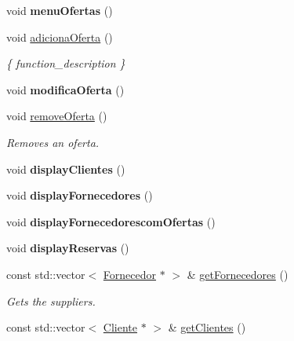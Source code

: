 \begin{DoxyCompactItemize}
\mbox{\label{classEmpresa_a3cab1a61ff84c5b20ac2faa6251e25ed}} 
void {\bfseries menu\+Ofertas} ()
\item 
\mbox{\label{classEmpresa_ae244a8ae3afb85eb5e9e5febce8b8728}} 
void \hyperlink{classEmpresa_ae244a8ae3afb85eb5e9e5febce8b8728}{adiciona\+Oferta} ()
\begin{DoxyCompactList}\small\item\em \{ function\+\_\+description \} \end{DoxyCompactList}\item 
\mbox{\label{classEmpresa_ac8948065c65d5c02cb30103118f502d4}} 
void {\bfseries modifica\+Oferta} ()
\item 
\mbox{\label{classEmpresa_a5b5c42d733ccee37f932db5db8aec243}} 
void \hyperlink{classEmpresa_a5b5c42d733ccee37f932db5db8aec243}{remove\+Oferta} ()
\begin{DoxyCompactList}\small\item\em Removes an oferta. \end{DoxyCompactList}\item 
\mbox{\label{classEmpresa_a28e04d59daa7206bec6055249ce17410}} 
void {\bfseries display\+Clientes} ()
\item 
\mbox{\label{classEmpresa_a55c3756c01b45b41ad03f4e4f3e4dcac}} 
void {\bfseries display\+Fornecedores} ()
\item 
\mbox{\label{classEmpresa_aa47e9a64800a41180b7f374b73a1f32b}} 
void {\bfseries display\+Fornecedorescom\+Ofertas} ()
\item 
\mbox{\label{classEmpresa_a8c89e6053eaccf0e1938a4f2ab0bfdc4}} 
void {\bfseries display\+Reservas} ()
\item 
const std\+::vector$<$ \hyperlink{classFornecedor}{Fornecedor} $\ast$ $>$ \& \hyperlink{classEmpresa_aaf131a375aa70819205744328a4dbc07}{get\+Fornecedores} ()
\begin{DoxyCompactList}\small\item\em Gets the suppliers. \end{DoxyCompactList}\item 
const std\+::vector$<$ \hyperlink{classCliente}{Cliente} $\ast$ $>$ \& \hyperlink{classEmpresa_a472beae89ee1187e1ec3f70e9d4a99ef}{get\+Clientes} ()

\end{DoxyCompactItemize}
